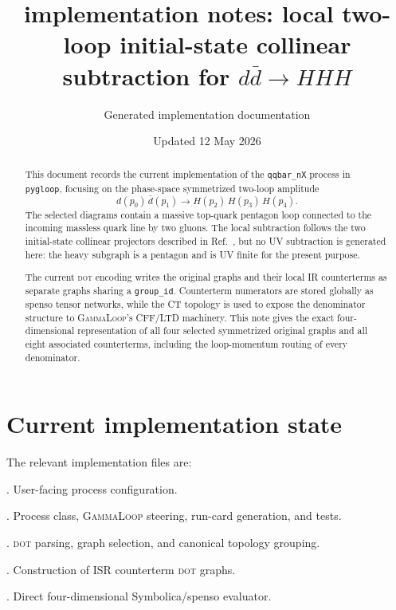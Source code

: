 \documentclass[11pt]{article}
\title{\qqbarNX{} implementation notes: local two-loop initial-state collinear subtraction for \(d\bar d\to HHH\)}
\author{Generated implementation documentation}
\date{Updated 12 May 2026}
\newcommand{\GammaLoop}{\textsc{GammaLoop}}
\newcommand{\pygloop}{\texttt{pygloop}}
\newcommand{\qqbarNX}{\texttt{qqbar\_nX}}
\newcommand{\DOT}{\textsc{dot}}
\begin{document}
\maketitle

\begin{abstract}
This document records the current implementation of the \qqbarNX{} process in
\pygloop{}, focusing on the phase-space symmetrized two-loop amplitude
\[
  d(p_0)\,\bar d(p_1)\to H(p_2)\,H(p_3)\,H(p_4).
\]
The selected diagrams contain a massive top-quark pentagon loop connected to
the incoming massless quark line by two gluons.  The local subtraction follows
the two initial-state collinear projectors described in
Ref.~\cite{KermanschahVicini2026}, but no UV subtraction is generated here:
the heavy subgraph is a pentagon and is UV finite for the present purpose.

The current \DOT{} encoding writes the original graphs and their local IR
counterterms as separate graphs sharing a \texttt{group\_id}.  Counterterm
numerators are stored globally as spenso tensor networks, while the CT
topology is used to expose the denominator structure to \GammaLoop{}'s CFF/LTD
machinery.  This note gives the exact four-dimensional representation of all
four selected symmetrized original graphs and all eight associated
counterterms, including the loop-momentum routing of every denominator.
\end{abstract}

\tableofcontents

\section{Current implementation state}

The relevant implementation files are:
\begin{description}[leftmargin=2.5cm,style=nextline]
\item[\texttt{config.toml}]
.  User-facing process configuration.
\item[\texttt{qqbar\_nX.py}]
.  Process class, \GammaLoop{}
steering, run-card generation, and tests.
\item[\texttt{qqbar\_nX\_graphs.py}]
.  \DOT{} parsing, graph
selection, and canonical topology grouping.
\item[\texttt{qqbar\_nX\_counterterms.py}]
.  Construction of ISR
counterterm \DOT{} graphs.
\item[\texttt{qqbar\_nX\_4d.py}]
.  Direct four-dimensional
Symbolica/spenso evaluator.
\end{description}
\end{document}
